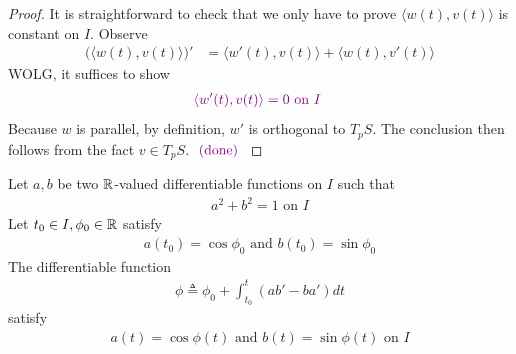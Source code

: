 \documentclass{report}
\begin{document}
\begin{proof}
It is straightforward to check that we only have to prove $\langle w(t),v(t)\rangle $ is constant on $I$. Observe 
\begin{align*}
\Big(\langle w(t),v(t)\rangle  \Big)'&= \langle w'(t),v(t)\rangle  + \langle w(t),v'(t)\rangle 
\end{align*}
WOLG, it suffices to show 
\begin{align*}
\textcolor{violet}{\langle w'(t),v(t)\rangle =0\text{ on $I$ } }
\end{align*}
Because $w$ is parallel, by definition, $w'$ is orthogonal to  $T_pS$. The conclusion then follows from the fact $v \in T_pS$. $\textcolor{violet}{\text{ (done) }}$
\end{proof}
\begin{lemma}
Let $a,b$ be two $\mathbb{R}$-valued differentiable functions on  $I$ such that
\begin{align*}
  a^2+b^2=1\text{ on }I
\end{align*}
Let $t_0\in I,\phi_0\in\mathbb{R}$ satisfy 
\begin{align*}
a(t_0)=\cos \phi_0\text{ and }b(t_0)=\sin \phi_0
\end{align*}
The differentiable function 
\begin{align*}
\phi \triangleq  \phi_0 + \int_{t_0}^t (ab'-ba')dt
\end{align*}
satisfy 
\begin{align*}
a(t)=\cos \phi (t)\text{ and }b(t)=\sin \phi (t)\text{ on }I
\end{align*}
\end{lemma}
\end{document}
